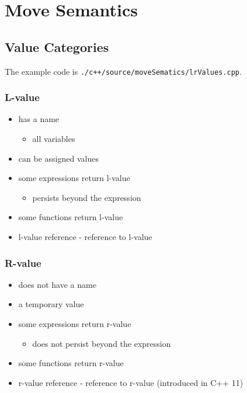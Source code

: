 \section{Move Semantics} 

\subsection{Value Categories} 

The example code is \texttt{./c++/source/moveSematics/lrValues.cpp}.

\subsubsection{L-value} 

\begin{itemize}
    \item has a name
    \begin{itemize}
      \item all variables
    \end{itemize}
    \item can be assigned values
    \item some expressions return l-value
    \begin{itemize}
      \item persists beyond the expression
    \end{itemize}
    \item some functions return l-value
    \item l-value reference - reference to l-value
\end{itemize}

\subsubsection{R-value} 

\begin{itemize}
    \item does not have a name
    \item a temporary value
    \item some expressions return r-value
    \begin{itemize}
      \item does not persist beyond the expression
    \end{itemize}
    \item some functions return r-value
    \item r-value reference - reference to r-value (introduced in C++ 11)
\end{itemize}

